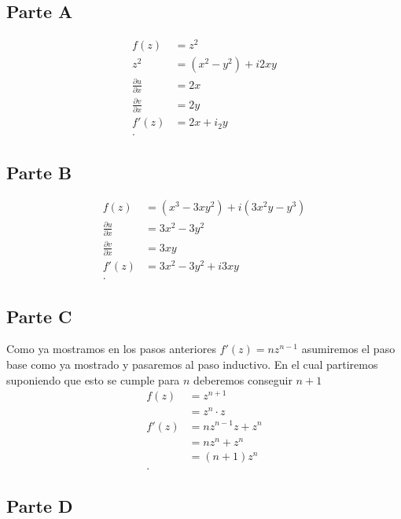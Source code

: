 \documentclass[12pt]{exam}
\begin{document}
\subsection*{Parte A}

\begin{align*}
  f(z) &= z^2 \\
  z^2 &= \left( x^2 - y^2 \right) + i 2xy\\
  \frac{\partial u}{\partial x} &= 2x \\
  \frac{\partial v}{\partial x}  &= 2y \\
  f'(z) &= 2x + i_2y \\
.\end{align*}

\subsection*{Parte B}

\begin{align*}
  f(z) &= \left( x^3 - 3xy^2 \right)  + i\left( 3x^2y - y^{3} \right) \\
  \frac{\partial u}{\partial x}  &= 3x^2 - 3y^2 \\
  \frac{\partial v}{\partial x}  &= 3xy\\
  f'(z) &= 3x^2 - 3y^2 + i 3xy \\
.\end{align*}

\subsection*{Parte C}

Como ya mostramos en los pasos anteriores $f'(z) = nz^{n-1}$ asumiremos el paso base como ya mostrado y pasaremos al paso inductivo. En el cual partiremos suponiendo que esto se cumple para $n$ deberemos conseguir  $n+1$
\begin{align*}
  f(z) &= z^{n+1} \\
  &= z^{n}\cdot z \\
  f'(z) &= nz^{n-1}z + z^{n} \\
  &= nz^{n} + z^{n} \\
  &= \left( n+1 \right)z^{n}  \\
.\end{align*}

\subsection*{Parte D}
\end{document}
